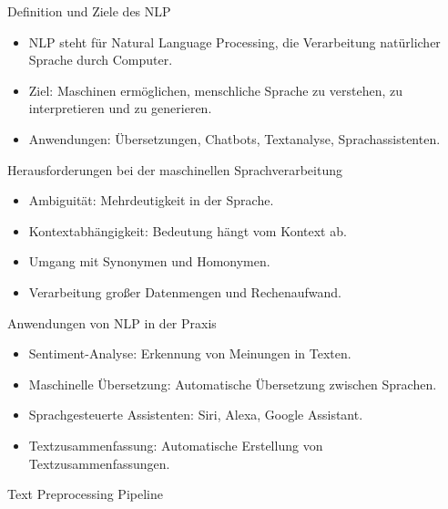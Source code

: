 \documentclass[aspectratio=1610, xcolor=dvipsnames, 9pt]{beamer}
\begin{document}
\begin{frame}{Definition und Ziele des NLP}
  \begin{itemize}
    \item NLP steht für Natural Language Processing, die Verarbeitung natürlicher Sprache durch Computer.
    \item Ziel: Maschinen ermöglichen, menschliche Sprache zu verstehen, zu interpretieren und zu generieren.
    \item Anwendungen: Übersetzungen, Chatbots, Textanalyse, Sprachassistenten.
  \end{itemize}
\end{frame}

\begin{frame}{Herausforderungen bei der maschinellen Sprachverarbeitung}
  \begin{itemize}
    \item Ambiguität: Mehrdeutigkeit in der Sprache.
    \item Kontextabhängigkeit: Bedeutung hängt vom Kontext ab.
    \item Umgang mit Synonymen und Homonymen.
    \item Verarbeitung großer Datenmengen und Rechenaufwand.
  \end{itemize}
\end{frame}

\begin{frame}{Anwendungen von NLP in der Praxis}
  \begin{itemize}
    \item Sentiment-Analyse: Erkennung von Meinungen in Texten.
    \item Maschinelle Übersetzung: Automatische Übersetzung zwischen Sprachen.
    \item Sprachgesteuerte Assistenten: Siri, Alexa, Google Assistant.
    \item Textzusammenfassung: Automatische Erstellung von Textzusammenfassungen.
  \end{itemize}
\end{frame}

\begin{frame}{Text Preprocessing Pipeline}
\end{frame}
\end{document}

